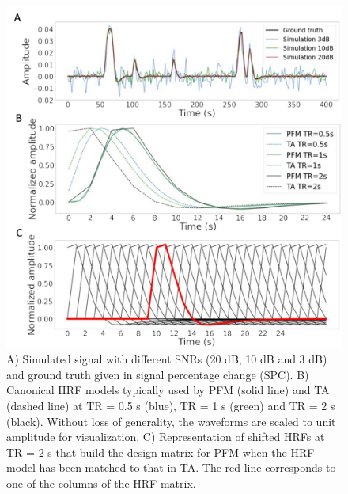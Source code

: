 \begin{figure}[t!]
    \begin{center}
        \includegraphics[width=0.75\columnwidth]{figures/synthesis_analysis/sim_and_hrf.pdf}
    \end{center}
    \caption{A) Simulated signal with different SNRs (20 dB, 10 dB and 3 dB) and ground truth given in signal percentage change (SPC). B) Canonical HRF models typically used by PFM (solid line) and TA (dashed line) at TR = 0.5 s (blue), TR = 1 s (green) and TR = 2 s (black). Without loss of generality, the waveforms are scaled to unit amplitude for visualization. C) Representation of shifted HRFs at TR = 2 s that build the design matrix for PFM when the HRF model has been matched to that in TA. The red line corresponds to one of the columns of the HRF matrix.}
\label{fig:sim_and_hrf}
\end{figure}

